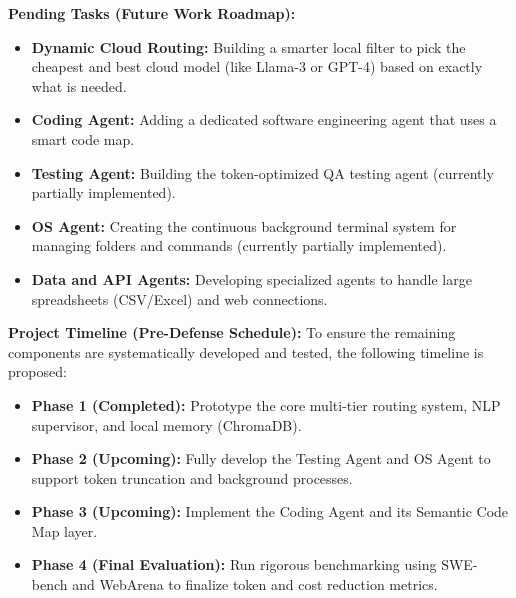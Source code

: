 \textbf{Pending Tasks (Future Work Roadmap):}
\begin{itemize}
    \item \textbf{Dynamic Cloud Routing:} Building a smarter local filter to pick the cheapest and best cloud model (like Llama-3 or GPT-4) based on exactly what is needed.
    \item \textbf{Coding Agent:} Adding a dedicated software engineering agent that uses a smart code map.
    \item \textbf{Testing Agent:} Building the token-optimized QA testing agent (currently partially implemented).
    \item \textbf{OS Agent:} Creating the continuous background terminal system for managing folders and commands (currently partially implemented).
    \item \textbf{Data and API Agents:} Developing specialized agents to handle large spreadsheets (CSV/Excel) and web connections.
\end{itemize}

\textbf{Project Timeline (Pre-Defense Schedule):}
To ensure the remaining components are systematically developed and tested, the following timeline is proposed:\\
\begin{itemize}
    \item \textbf{Phase 1 (Completed):} Prototype the core multi-tier routing system, NLP supervisor, and local memory (ChromaDB).
    \item \textbf{Phase 2 (Upcoming):} Fully develop the Testing Agent and OS Agent to support token truncation and background processes.
    \item \textbf{Phase 3 (Upcoming):} Implement the Coding Agent and its Semantic Code Map layer.
    \item \textbf{Phase 4 (Final Evaluation):} Run rigorous benchmarking using SWE-bench and WebArena to finalize token and cost reduction metrics.
\end{itemize}

